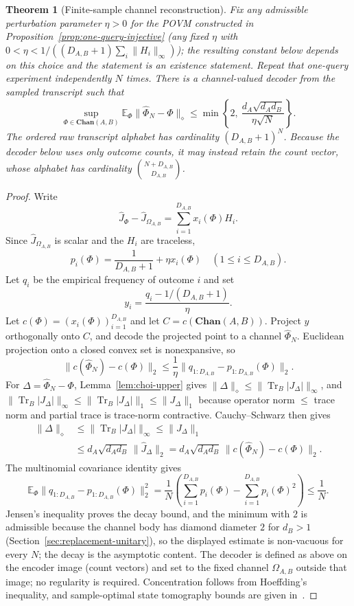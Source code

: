 \documentclass[11pt,a4paper]{article}
\theoremstyle{definition}
\theoremstyle{plain}
\newtheorem{theorem}{Theorem}[section]
\theoremstyle{remark}
\DeclareMathOperator{\Tr}{Tr}
\newcommand{\Chan}{\mathbf{Chan}}
\begin{document}
\begin{theorem}[Finite-sample channel reconstruction]
\label{thm:sampled-achievability}
Fix any admissible perturbation parameter $\eta>0$ for the POVM constructed
in Proposition~\ref{prop:one-query-injective} (any fixed $\eta$ with $0<\eta<1/((D_{A,B}+1)\sum_i\|H_i\|_\infty)$); the resulting constant below
depends on this choice and the statement is an existence statement. Repeat that one-query experiment independently
$N$ times. There is a channel-valued decoder from the sampled transcript
such that
\[
\sup_{\Phi\in\Chan(A,B)}
\mathbb E_\Phi
\|\widehat\Phi_N-\Phi\|_\diamond
\leq
\min\left\{2,\ \frac{d_A\sqrt{d_Ad_B}}{\eta\sqrt N}\right\}.
\]
The ordered raw transcript alphabet has cardinality
$(D_{A,B}+1)^N$. Because the decoder below uses only outcome counts, it may
instead retain the count vector, whose alphabet has cardinality
$\binom{N+D_{A,B}}{D_{A,B}}$.
\end{theorem}

\begin{proof}
Write
\[
\widehat J_\Phi-\widehat J_{\Omega_{A,B}}
=\sum_{i=1}^{D_{A,B}}x_i(\Phi)H_i.
\]
Since $\widehat J_{\Omega_{A,B}}$ is scalar and the $H_i$ are traceless,
\[
p_i(\Phi)=\frac1{D_{A,B}+1}+\eta x_i(\Phi)
\quad(1\leq i\leq D_{A,B}).
\]
Let $q_i$ be the empirical frequency of outcome $i$ and set
\[
y_i=\frac{q_i-1/(D_{A,B}+1)}{\eta}.
\]
Let $c(\Phi)=(x_i(\Phi))_{i=1}^{D_{A,B}}$ and let
$C=c(\Chan(A,B))$. Project $y$ orthogonally onto $C$, and decode the
projected point to a channel $\widehat\Phi_N$. Euclidean projection onto a
closed convex set is nonexpansive, so
\[
\|c(\widehat\Phi_N)-c(\Phi)\|_2
\leq\frac1\eta\|q_{1:D_{A,B}}-p_{1:D_{A,B}}(\Phi)\|_2.
\]
For $\Delta=\widehat\Phi_N-\Phi$, Lemma~\ref{lem:choi-upper} gives $\|\Delta\|_\diamond\le\|\Tr_B|J_\Delta|\|_\infty$, and $\|\Tr_B|J_\Delta|\|_\infty\le\|\Tr_B|J_\Delta|\|_1\le\|J_\Delta\|_1$ because operator norm $\le$ trace norm and partial trace is trace-norm contractive. Cauchy--Schwarz then gives
\begin{align*}
\|\Delta\|_\diamond
&\leq\|\Tr_B|J_\Delta|\|_\infty
\leq\|J_\Delta\|_1\\
&\leq d_A\sqrt{d_Ad_B}\,\|\widehat J_\Delta\|_2
=d_A\sqrt{d_Ad_B}\,
\|c(\widehat\Phi_N)-c(\Phi)\|_2.
\end{align*}
The multinomial covariance identity gives
\[
\mathbb E_\Phi
\|q_{1:D_{A,B}}-p_{1:D_{A,B}}(\Phi)\|_2^2
=\frac1N\left(
\sum_{i=1}^{D_{A,B}}p_i(\Phi)
-\sum_{i=1}^{D_{A,B}}p_i(\Phi)^2
\right)
\leq\frac1N.
\]
Jensen's inequality proves the decay bound, and the minimum with $2$ is
admissible because the channel body has diamond diameter $2$ for $d_B>1$
(Section~\ref{sec:replacement-unitary}), so the displayed estimate is
non-vacuous for every $N$; the decay is the asymptotic content. The decoder is defined as above on the encoder image (count vectors) and set to the fixed channel $\Omega_{A,B}$ outside that image; no regularity is required. Concentration follows from Hoeffding's inequality, and sample-optimal state tomography bounds are given in~\cite{HaahEtAl2017}.
\end{proof}
\end{document}
